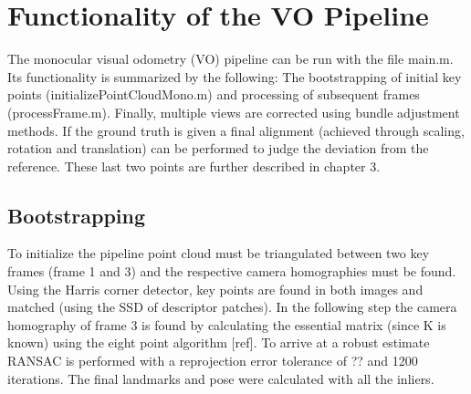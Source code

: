 \chapter{Functionality of the VO Pipeline}
The monocular visual odometry (VO) pipeline can be run with the file main.m. Its functionality is summarized by the following: The bootstrapping of initial key points (initializePointCloudMono.m) and processing of subsequent frames (processFrame.m). Finally, multiple views are corrected using bundle adjustment methods. If the ground truth is given a final alignment (achieved through scaling, rotation and translation) can be performed to judge the deviation from the reference. These last two points are further described in chapter 3.  

\section{Bootstrapping}
To initialize the pipeline point cloud must be triangulated between two key frames (frame 1 and 3) and the respective camera homographies must be found. Using the Harris corner detector, key points are found in both images and matched (using the SSD of descriptor patches). In the following step the camera homography of frame 3 is found by calculating the essential matrix (since K is known) using the eight point algorithm [ref]. To arrive at a robust estimate RANSAC is performed with a reprojection error tolerance of ?? and 1200 iterations. The final landmarks and pose were calculated with all the inliers.

